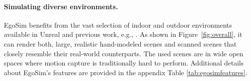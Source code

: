 
\paragraph{Simulating diverse environments.}
EgoSim benefits from the vast selection of indoor and outdoor environments available in Unreal and previous work, e.g., \cite{bedlam}. As shown in Figure~\ref{fig:overall}, it can render both, large, realistic hand-modeled scenes and scanned scenes that closely resemble their real-world counterparts. The used scenes are in wide open spaces where motion capture is traditionally hard to perform.
Additional details about EgoSim's features are provided in the appendix Table \ref{tab:egosimfeatures}.



